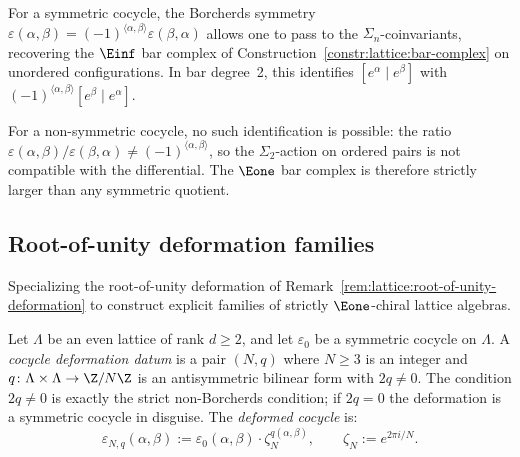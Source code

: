 \begin{remark}
\label{rem:e1-vs-einf-bar}
For a symmetric cocycle, the Borcherds symmetry
$\varepsilon(\alpha,\beta) =
(-1)^{\langle\alpha,\beta\rangle}\varepsilon(\beta,\alpha)$
allows one to pass to the $\Sigma_n$-coinvariants, recovering the
$\Einf$ bar complex of Construction~\ref{constr:lattice:bar-complex}
on unordered configurations. In bar degree~2, this identifies
$[e^\alpha \mid e^\beta]$ with
$(-1)^{\langle\alpha,\beta\rangle} [e^\beta \mid e^\alpha]$.

For a non-symmetric cocycle, no such identification is possible: the
ratio $\varepsilon(\alpha,\beta)/\varepsilon(\beta,\alpha) \neq
(-1)^{\langle\alpha,\beta\rangle}$, so the $\Sigma_2$-action
on ordered pairs is not compatible with the differential. The
$\Eone$ bar complex is therefore strictly larger than any symmetric
quotient.
\end{remark}


\subsection{Root-of-unity deformation families}

Specializing the root-of-unity deformation of
Remark~\ref{rem:lattice:root-of-unity-deformation} to construct
explicit families of strictly $\Eone$-chiral lattice algebras.

\begin{definition}\label{def:lattice:cocycle-deformation}
Let $\Lambda$ be an even lattice of rank $d \geq 2$, and let
$\varepsilon_0$ be a symmetric cocycle on $\Lambda$. A
\emph{cocycle deformation datum} is a pair $(N, q)$ where $N \geq 3$
is an integer and $q \colon \Lambda \times \Lambda \to \Z/N\Z$ is an
antisymmetric bilinear form with $2q\neq0$. The condition $2q\neq0$
is exactly the strict non-Borcherds condition; if $2q=0$ the
deformation is a symmetric cocycle in disguise. The
\emph{deformed cocycle} is:
\begin{equation}\label{eq:lattice:deformed-cocycle}
\varepsilon_{N,q}(\alpha, \beta)
:= \varepsilon_0(\alpha, \beta) \cdot
 \zeta_N^{q(\alpha,\beta)},
\qquad \zeta_N := e^{2\pi i/N}.
\end{equation}
\end{definition}

